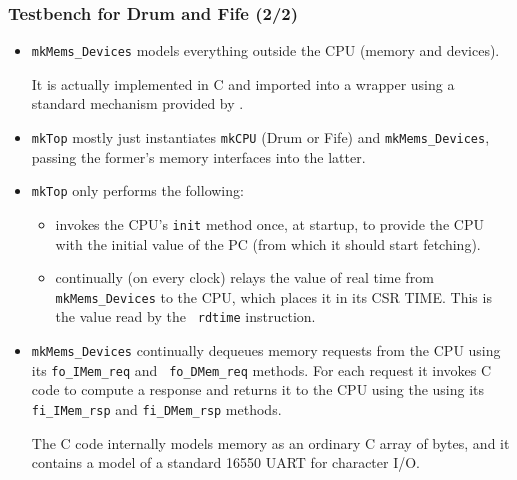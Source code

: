 \begin{frame}[fragile]
\frametitle{Testbench for Drum and Fife (2/2)}

\footnotesize

\begin{itemize}
  \item {\tt mkMems\_Devices} models everything outside the CPU (memory and devices).

      It is actually implemented in C and imported into a {\BSV}
      wrapper using a standard mechanism provided by {\BSV}.

  \vx

  \item {\tt mkTop} mostly just instantiates {\tt mkCPU} (Drum or
      Fife) and {\tt mkMems\_Devices}, passing the former's memory
      interfaces into the latter.

  \vx

  \item {\tt mkTop} only performs the following:

      \begin{itemize}
        \item invokes the CPU's {\tt init} method once, at startup, to
            provide the CPU with the initial value of the PC (from
            which it should start fetching).

        \vx

        \item continually (on every clock) relays the value of real
            time from {\tt mkMems\_Devices} to the CPU, which places
            it in its CSR TIME.  This is the value read by the {\tt
            rdtime} instruction.

      \end{itemize}

  \item {\tt mkMems\_Devices} continually dequeues memory requests
      from the CPU using its {\tt fo\_IMem\_req} and {\tt
      fo\_DMem\_req} methods.  For each request it invokes C code to
      compute a response and returns it to the CPU using the using its
      {\tt fi\_IMem\_rsp} and {\tt fi\_DMem\_rsp} methods.

      The C code internally models memory as an ordinary C array of
      bytes, and it contains a model of a standard 16550 UART for
      character I/O.

\end{itemize}

\end{frame}

